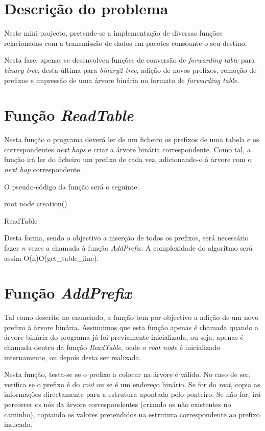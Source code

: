 \documentclass[a4paper]{article}
\begin{document}

\section{Descrição do problema}
Neste mini-projecto, pretende-se a implementação de diversas funções relacionadas com a transmissão de dados em pacotes consoante
o seu destino.

Nesta fase, apenas se desenvolveu funções de conversão de \textit{forwarding table} para \textit{binary tree}, desta última para
\textit{binary2-tree}, adição de novos prefixos, remoção de prefixos e impressão de uma árvore binária no formato de
\textit{forwarding table}.

\section{Função \textit{ReadTable}}
Nesta função o programa deverá ler de um ficheiro os prefixos de uma tabela e os correspondentes \textit{next hops} e criar a 
árvore binária correspondente.
Como tal, a função irá ler do ficheiro um prefixo de cada vez, adicionando-o à árvore com o \textit{next hop} correspondente.

O pseudo-código da função será o seguinte:

\begin{algorithm}[H]
 root node creation()\;
 \caption{ReadTable}
\end{algorithm}
Desta forma, sendo o objectivo a inserção de todos os prefixos, será necessário fazer \textit{n} vezes a chamada à função \textit{AddPrefix}. A complexidade do algoritmo será assim O(n)O(get\_table\_line).

\section{Função \textit{AddPrefix}}
Tal como descrito no enunciado, a função tem por objectivo a adição de um novo prefixo à árvore binária. Assumimos que esta função apenas é chamada quando a árvore binária do programa já foi previamente inicializada, ou seja, apenas é chamada dentro da função \textit{ReadTable}, onde o \textit{root node} é inicializado internamente, ou depois desta ser realizada.

Nesta função, testa-se se o prefixo a colocar na árvore é válido. No caso de ser, verifica se o prefixo é do \textit{root} ou se é um endereço binário. Se for do \textit{root}, copia as informações directamente para a estrutura apontada pelo ponteiro. Se não for, irá percorrer os nós da árvore correspondentes (criando os não existentes no caminho), copiando os valores pretendidos na estrutura correspondente ao prefixo indicado.
\end{document}
